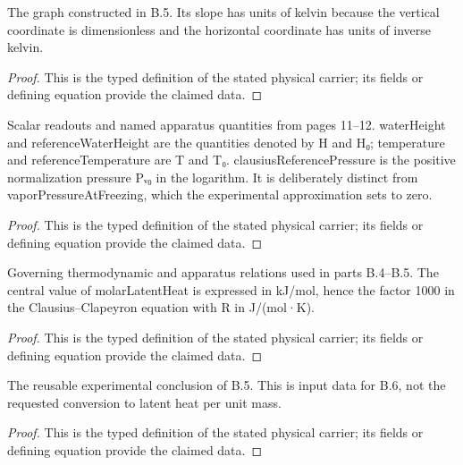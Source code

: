 \begin{definition}
  \label{def:physics:IPhO_2026_4_B_6:aux005}
  The graph constructed in B.5. Its slope has units of kelvin because the vertical coordinate is dimensionless and the horizontal coordinate has units of inverse kelvin.
\end{definition}
\begin{proof}
  This is the typed definition of the stated physical carrier; its fields or defining equation provide the claimed data.
\end{proof}

\begin{definition}
  \label{def:physics:IPhO_2026_4_B_6:aux006}
  Scalar readouts and named apparatus quantities from pages 11--12. waterHeight and referenceWaterHeight are the quantities denoted by H and H₀; temperature and referenceTemperature are T and T₀. clausiusReferencePressure is the positive normalization pressure Pᵥ₀ in the logarithm. It is deliberately distinct from vaporPressureAtFreezing, which the experimental approximation sets to zero.
\end{definition}
\begin{proof}
  This is the typed definition of the stated physical carrier; its fields or defining equation provide the claimed data.
\end{proof}

\begin{definition}
  \label{def:physics:IPhO_2026_4_B_6:aux007}
  Governing thermodynamic and apparatus relations used in parts B.4--B.5. The central value of molarLatentHeat is expressed in kJ/mol, hence the factor 1000 in the Clausius--Clapeyron equation with R in J/(mol·K).
\end{definition}
\begin{proof}
  This is the typed definition of the stated physical carrier; its fields or defining equation provide the claimed data.
\end{proof}

\begin{definition}
  \label{def:physics:IPhO_2026_4_B_6:aux008}
  The reusable experimental conclusion of B.5. This is input data for B.6, not the requested conversion to latent heat per unit mass.
\end{definition}
\begin{proof}
  This is the typed definition of the stated physical carrier; its fields or defining equation provide the claimed data.
\end{proof}

